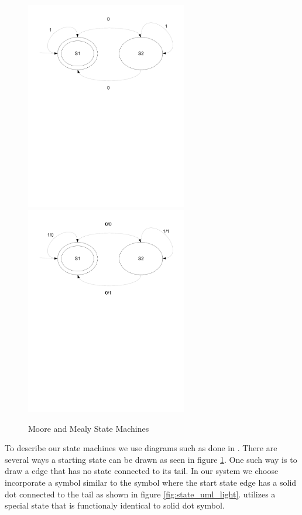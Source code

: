 \begin{figure}[htp]
    \centering
    \includegraphics[trim= 15mm 150mm 15mm 10mm, clip, width=200pt]{./images/state_moore.pdf} 
    \includegraphics[trim= 15mm 150mm 15mm 10mm, clip, width=200pt]{./images/state_mealy.pdf}    
    \caption{Moore and Mealy State Machines}
    \label{fig:state_moore_mealy}
\end{figure}

To describe our state machines we use diagrams such as done in  \cite{UML2}. There are several ways a starting state can be drawn as seen in figure \ref{fig:state_moore_mealy}.
One such way is to draw a edge that has no state connected to its tail. In our system we choose incorporate a symbol similar to  the  \cite{UML2} symbol where the start state edge has a solid dot connected to the tail as shown in figure \ref{fig:state_uml_light}. {\plccharts} utilizes a special  state that is functionaly identical to  solid dot symbol.

